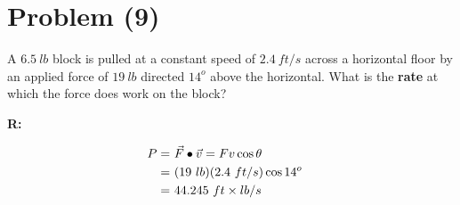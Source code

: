 \section{Problem (9)}
	A $6.5 \ lb$ block is pulled at a constant speed of $2.4 \ ft/s$ across a horizontal floor by an applied force of $19 \ lb$ directed $14^{o}$ above the horizontal. What is the \textbf{rate} at which the force does work on the block?

	\textbf{R:}

	\begin{align}
		P = \ &\vec{F} \bullet \vec{v} = Fv \cos \theta& \notag \\
		= \ &(19 \ lb)(2.4 \ ft/s) \cos 14^{o}& \notag \\
		= \ &44.245 \ ft \times lb/s&
	\end{align}
